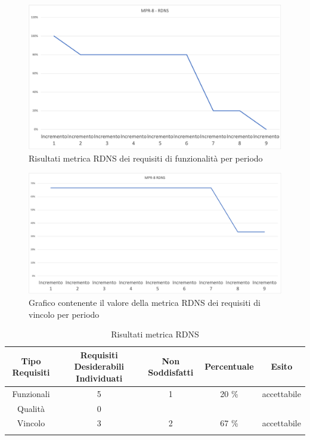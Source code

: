 \begin{center}
        \begin{figure}[!htb]
        \centering
        \includegraphics[scale=0.40]{res/images/ra/RA_RDNS_FUNZ.png}
        \caption{Risultati metrica RDNS dei requisiti di funzionalità per periodo}
    \end{figure}
    \begin{figure}[!htb]
        \centering
        \includegraphics[scale=0.40]{res/images/ra/RA_RDNS_VINC.png}
        \caption{Grafico contenente il valore della metrica RDNS dei requisiti di vincolo per periodo}
    \end{figure}
    \begin{center}
    \end{center}
\end{center}

\begin{center}
    \begin{longtable}{|c|c|c|c|c|}
        \hline
        \rowcolor{lighter-grayer}
        \textbf {Tipo Requisiti} & \textbf{Requisiti Desiderabili Individuati} & \textbf{Non Soddisfatti} & \textbf{Percentuale} & \textbf{Esito} \\ \hline
        \endfirsthead

        \hline
        Funzionali & 5 & 1 & 20 \%  &  accettabile                \\
           Qualità & 0 &  &  &                        \\
           Vincolo & 3 &  2 &  67 \%&    accettabile                    \\ 
        \hline
        \rowcolor{white}
        \caption{Risultati metrica RDNS}
    \end{longtable}
\end{center}